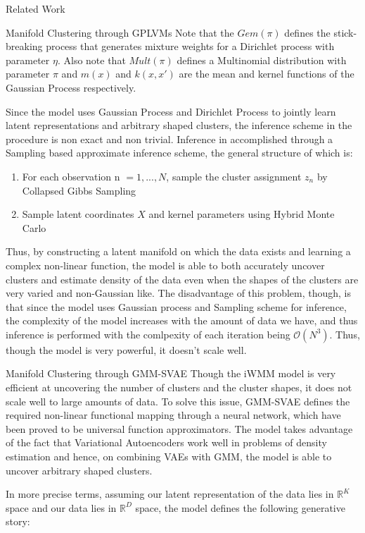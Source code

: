 \documentclass{article}
\begin{document}
\begin{psection}{Related Work}
\begin{psubsection}{Manifold Clustering through GPLVMs}
	Note that the $Gem(\pi)$ defines the stick-breaking process that generates mixture weights for a Dirichlet process with parameter $\eta$. Also note that $Mult(\pi)$ defines a Multinomial distribution with parameter $\pi$ and $m(x)$ and $k(x,x')$ are the mean and kernel functions of the Gaussian Process respectively.

	Since the model uses Gaussian Process and Dirichlet Process to jointly learn latent representations and arbitrary shaped clusters, the inference scheme in the procedure is non exact and non trivial. Inference in accomplished through a Sampling based approximate inference scheme, the general structure of which is:

	\begin{enumerate}
		\item For each observation n $= 1,...,N$, sample the cluster assignment $z_n$ by Collapsed Gibbs Sampling
		\item Sample latent coordinates $X$ and kernel parameters using Hybrid Monte Carlo
	\end{enumerate}

	Thus, by constructing a latent manifold on which the data exists and learning a complex non-linear function, the model is able to both accurately uncover clusters and estimate density of the data even when the shapes of the clusters are very varied and non-Gaussian like. The disadvantage of this problem, though, is that since the model uses Gaussian process and Sampling scheme for inference, the complexity of the model increases with the amount of data we have, and thus inference is performed with the comlpexity of each iteration being $\mathcal{O}(N^3)$. Thus, though the model is very powerful, it doesn't scale well.

\end{psubsection}

\begin{psubsection}{Manifold Clustering through GMM-SVAE}
Though the iWMM model is very efficient at uncovering the number of clusters and the cluster shapes, it does not scale well to large amounts of data. To solve this issue, GMM-SVAE \citep{svae} defines the required non-linear functional mapping through a neural network, which have been proved to be universal function approximators. The model takes advantage of the fact that Variational Autoencoders work well in problems of density estimation and hence, on combining VAEs with GMM, the model is able to uncover arbitrary shaped clusters.

In more precise terms, assuming our latent representation of the data lies in $\mathbb{R}^K$ space and our data lies in $\mathbb{R}^D$ space, the model defines the following generative story:


\end{psubsection}
\end{psection}
\end{document}
